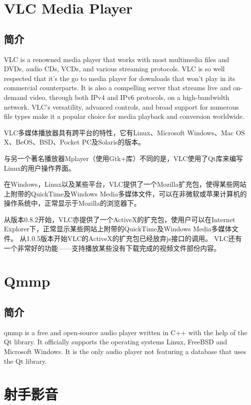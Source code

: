 \documentclass[paper=a4,fontsize=11pt]{article}
\begin{document}
	\section{VLC Media Player}	
	
	\subsection{简介}
	VLC is a renowned media player that works with most multimedia files and DVDs, audio CDs, VCDs, and various streaming protocols. VLC is so well respected that it’s the go to media player for downloads that won’t play in its commercial counterparts. It is also a compelling server that streams live and on-demand video, through both IPv4 and IPv6 protocols, on a high-bandwidth network. VLC’s versatility, advanced controls, and broad support for numerous file types make it a popular choice for media playback and conversion worldwide. 
	
	VLC多媒体播放器具有跨平台的特性，它有Linux、Microsoft Windows、Mac OS X、BeOS、BSD、Pocket PC及Solaris的版本。
	
	与另一个著名播放器Mplayer（使用Gtk+库）不同的是，VLC使用了Qt库来编写Linux的用户操作界面。
	
	在Windows，Linux以及某些平台，VLC提供了一个Mozilla扩充包，使得某些网站上附带的QuickTime及Windows Media多媒体文件，可以在非微软或苹果计算机的操作系统中，正常显示于Mozilla的浏览器下。
	
	从版本0.8.2开始，VLC亦提供了一个ActiveX的扩充包，使用户可以在Internet Explorer下，正常显示某些网站上附带的QuickTime及Windows Media多媒体文件。
	从1.0.5版本开始VLC的ActiveX的扩充包已经放弃js接口的调用。
	VLC还有一个非常好的功能——支持播放某些没有下载完成的视频文件部份内容。
	
	\section{Qmmp}
	
	\subsection{简介}
	qmmp is a free and open-source audio player written in C++ with the help of the Qt library. It officially supports the operating systems Linux, FreeBSD and Microsoft Windows. It is the only audio player not featuring a database that uses the Qt library.
	
	\section{射手影音}
	
\end{document}
